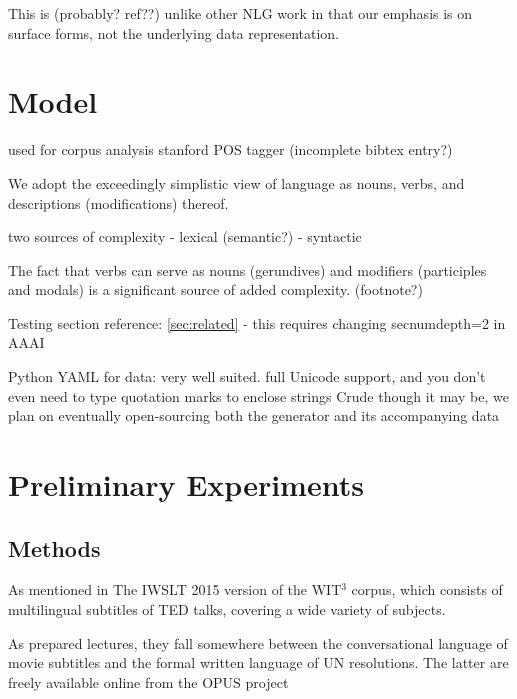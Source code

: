 This is (probably? ref??) unlike other NLG work in that our emphasis is on surface forms, not the underlying data representation.


\section{Model}

used for corpus analysis stanford POS tagger (incomplete bibtex entry?) 

We adopt the exceedingly simplistic view of language as nouns, verbs, and descriptions (modifications) thereof.

two sources of complexity
- lexical (semantic?)
- syntactic 

The fact that verbs can serve as nouns (gerundives) and modifiers (participles and modals) is a significant source of added complexity. (footnote?)

Testing section reference: \ref{sec:related} - this requires changing secnumdepth=2 in AAAI

Python
YAML for data: very well suited. full Unicode support, and you don't even need to type quotation marks to enclose strings
Crude though it may be, we plan on eventually open-sourcing both the generator and its accompanying data





\section{Preliminary Experiments}
\label{experiments}

\subsection{Methods}
As mentioned in 
The IWSLT 2015 version of the WIT$^3$ corpus, which consists of multilingual subtitles of TED talks, covering a wide variety of subjects. 

As prepared lectures, they fall somewhere between the conversational language of movie subtitles and the formal written language of UN resolutions.
The latter are freely available online from the OPUS project  

